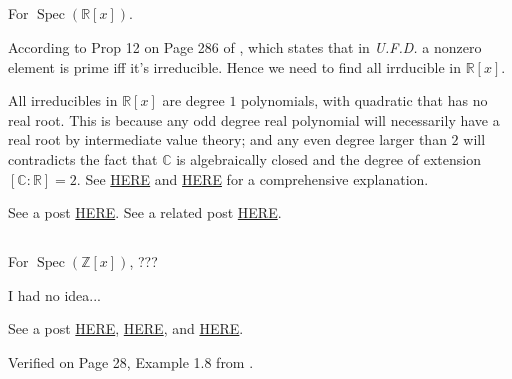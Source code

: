 \subsection{}
For $\operatorname{Spec}(\mathbb R[x])$. 

According to Prop 12 on Page 286 of \cite{dummit2004abstract}, which states that in \textit{U.F.D.} a nonzero element is prime iff it's irreducible. 
Hence we need to find all irrducible in $\mathbb R[x]$.

All irreducibles in $\mathbb R[x]$ are degree $1$ polynomials, with quadratic that has no real root. This is because any odd degree real polynomial will necessarily have a real root by intermediate value theory; and any even degree larger than $2$ will contradicts the fact that $\mathbb C$ is algebraically closed and the degree of extension $[\mathbb C:\mathbb R]=2$. See \href{https://math.stackexchange.com/questions/2127249/what-are-the-irreducible-elements-in-mathbbrx-and-mathbbcx}{HERE} and \href{https://math.stackexchange.com/questions/4088566/most-even-degree-polynomials-in-mathbbrx-are-reducible}{HERE} for a comprehensive explanation. 

See a post \href{https://math.stackexchange.com/questions/1057642/describe-the-topology-of-spec-mathbbrx}{HERE}.
See a related post \href{https://math.stackexchange.com/questions/4452569/describe-operatornamespec-mathbbrx-xn}{HERE}. 



\subsection{}

For $\operatorname{Spec}(\mathbb Z[x])$, ???

I had no idea... 

See a post \href{https://math.stackexchange.com/questions/4088566/most-even-degree-polynomials-in-mathbbrx-are-reducible}{HERE}, \href{https://math.stackexchange.com/questions/1089479/a-question-on-mumfords-drawing-of-textspec-mathbbzx}{HERE}, and \href{URLhttps://math.stackexchange.com/questions/174595/classification-of-prime-ideals-of-mathbbzx}{HERE}. 

Verified on Page 28, Example 1.8 from \cite{QingLiu2002algebraic}. 

\subsection{}

